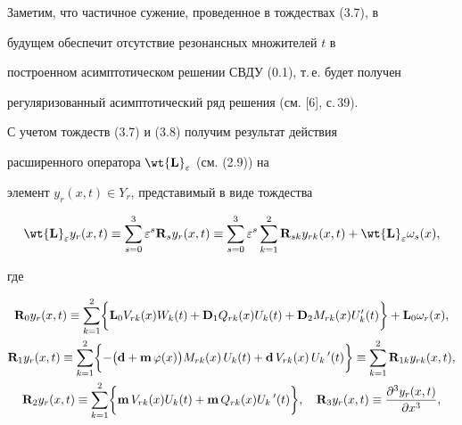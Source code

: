 Заметим, что частичное сужение, проведенное в тождествах (3.7), в


будущем обеспечит отсутствие резонансных множителей $t$ в


построенном асимптотическом решении СВДУ (0.1), т.\,е. будет получен


регуляризованный асимптотический ряд решения (см. [6], с.\,39).





С учетом тождеств (3.7) и (3.8) получим результат действия


расширенного оператора $\bold{\wt{L}}_{\e}$ (см. (2.9)) на


элемент $y_r (x, t) \in Y_r $, представимый в виде тождества


\begin{equation}


\wt{\bold{L}}_{\e} y_r (x, t) \equiv \sum \limits_{s=0} ^3


\e^s \bold{R}_s y_r (x, t)\equiv \sum \limits_{s=0} ^3 \e^s \sum


\limits_{k=1} ^2 \bold{R}_{sk} y_{rk} (x, t)


+ \wt{\bold{L}}_{\e} \omega_s (x), 


\end{equation}


где 


\begin{gather}


\bold{R}_0 y_{r} (x, t) \equiv \sum \limits_{k=1}^2 \biggl\{ \bold{L}_0


V_{rk} (x) W_k (t) + \bold{D}_1 Q_{rk} (x)U_k (t)


+ \bold{D}_2 M_{rk} (x) U'_k (t) \biggr\}


+\bold{L}_0 \o_r (x), \\


%


\bold{R}_1 y_r (x, t) \equiv \sum \limits_{k=1}^2 \biggl\{ -


\bigl(\bold{d} + \bold{m}\, \f(x) \bigr) M_{rk} (x)\, U_k (t)


+ \bold{d}\, V_{rk} (x) \,U_k\,' (t) \biggr\} \equiv \sum


\limits_{k=1}^2 \bold{R}_{1k} y_{rk} (x, t), \\


%


\bold{R}_2 y_r (x, t)  \equiv \sum \limits_{k=1}^2 \biggl\{


\bold{m} \, V_{rk} (x) U_k (t) + \bold{m} \, Q_{rk} (x) U_k\,'


(t) \biggr\}, \quad \bold{R}_3 y_r (x, t) \equiv \frac{\d^3 y_r


(x, t)}{\d x^3},


\end{gather}


